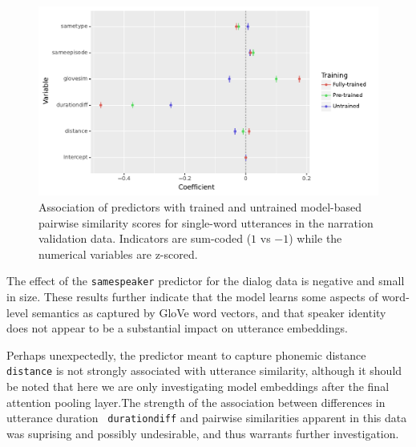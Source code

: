 \begin{figure}
  \centering
  \includegraphics[scale=0.66]{results/grsa_narration_coef.pdf}
  \caption{Association of predictors with trained and untrained
    model-based pairwise similarity scores for single-word utterances
    in the narration validation data. Indicators are sum-coded ($1$ vs
    $-1$) while the numerical variables are z-scored.}
  \label{fig:coef_narration}
\end{figure}



The effect of
the {\tt samespeaker} predictor for the dialog data is negative and
small in size.  These results further indicate that the model learns
some aspects of word-level semantics as captured by GloVe word
vectors, and that speaker identity does not appear to be a substantial
impact on utterance embeddings.

Perhaps unexpectedly, the predictor meant to capture phonemic distance
{\tt distance} is not strongly associated with utterance similarity,
although it should be noted that here we are only investigating model
embeddings after the final attention pooling layer.The strength of
the association between differences in utterance duration {\tt
  durationdiff} and pairwise similarities apparent in this data was
suprising and possibly undesirable, and thus warrants further investigation.

